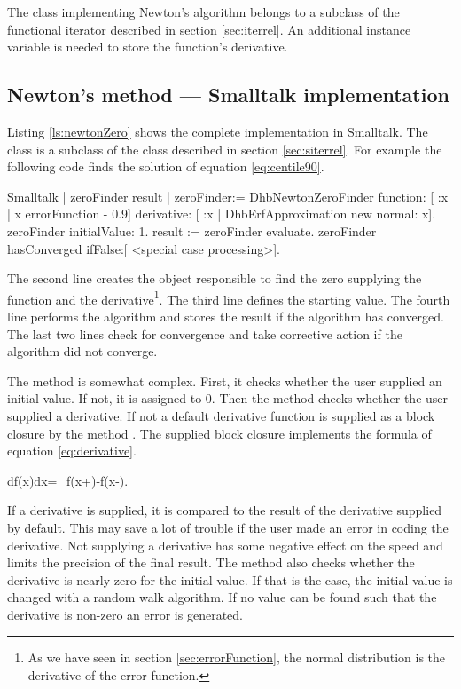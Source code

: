 The class implementing Newton's algorithm belongs to a subclass of
the functional iterator described in section \ref{sec:iterrel}. An
additional instance variable is needed to store the function's
derivative.

\subsection{Newton's method --- Smalltalk implementation}
\label{sec:snewton} Listing \ref{ls:newtonZero} shows the complete
implementation in Smalltalk. The class 
is a subclass of the class  described
in section \ref{sec:siterrel}. For example the following code
finds the solution of equation \ref{eq:centile90}.

\begin{displaycode}{Smalltalk}
| zeroFinder result |
zeroFinder:= DhbNewtonZeroFinder
            function: [ :x | x errorFunction - 0.9]
            derivative: [ :x | DhbErfApproximation new normal: x].
zeroFinder initialValue: 1.
result := zeroFinder evaluate.
zeroFinder hasConverged
   ifFalse:[ <special case processing>].
\end{displaycode}
The second line creates the object responsible to find the zero
supplying the function and the derivative\footnote{As we have seen
in section \ref{sec:errorFunction}, the normal distribution is the
derivative of the error function.}. The third line defines the
starting value. The fourth line performs the algorithm and stores
the result if the algorithm has converged. The last two lines
check for convergence and take corrective action if the algorithm
did not converge.

The method  is somewhat complex. First,
it checks whether the user supplied an initial value. If not, it
is assigned to 0. Then the method checks whether the user supplied
a derivative. If not a default derivative function is supplied as
a block closure by the method . The
supplied block closure implements the formula of equation
\ref{eq:derivative}.

\begin{mainEquation}
\label{eq:derivative} {df\left(x\right)\over dx}=\lim_{\epsilon{}}{f\left(x+\epsilon\right)-f\left(x-\epsilon\right)\epsilon}.
\end{mainEquation}

If a derivative is supplied, it is compared to the result of the
derivative supplied by default. This may save a lot of trouble if
the user made an error in coding the derivative. Not supplying a
derivative has some negative effect on the speed and limits the
precision of the final result. The method  also checks whether the derivative is nearly
zero for the initial value. If that is the case, the initial value
is changed with a random walk algorithm. If no value can be found
such that the derivative is non-zero an error is generated.

